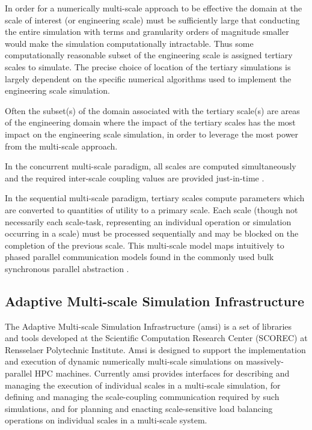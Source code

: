 \documentclass[11pt]{siamltex1213}
\begin{document}
In order for a numerically multi-scale approach to be effective the domain at the scale of interest (or engineering scale) must be sufficiently large that conducting the entire simulation with terms and granularity orders of magnitude smaller would make the simulation computationally intractable. Thus some computationally reasonable subset of the engineering scale is assigned tertiary scales to simulate. The precise choice of location of the tertiary simulations is largely dependent on the specific numerical algorithms used to implement the engineering scale simulation.

Often the subset(s) of the domain associated with the tertiary scale(s) are areas of the engineering domain where the impact of the tertiary scales has the most impact on the engineering scale simulation, in order to leverage the most power from the multi-scale approach.

In the concurrent multi-scale paradigm, all scales are computed simultaneously and the required inter-scale coupling values are provided just-in-time \cite{zeng2010concurrent}.

In the sequential multi-scale paradigm, tertiary scales compute parameters which are converted to quantities of utility to a primary scale. Each scale (though not necessarily each scale-task, representing an individual operation or simulation occurring in a scale) must be processed sequentially \cite{garcia2008sequential} and may be blocked on the completion of the previous scale. This multi-scale model maps intuitively to phased parallel communication models found in the commonly used bulk synchronous parallel abstraction \cite{valiant1990bridging}. 

\subsection{Adaptive Multi-scale Simulation Infrastructure}\label{amsi}
The Adaptive Multi-scale Simulation Infrastructure (amsi) is a set of libraries and tools developed at the Scientific Computation Research Center (SCOREC) at Rensselaer Polytechnic Institute. Amsi is designed to support the implementation and execution of dynamic numerically multi-scale simulations on massively-parallel HPC machines. Currently amsi provides interfaces for describing and managing the execution of individual scales in a multi-scale simulation, for defining and managing the scale-coupling communication required by such simulations, and for planning and enacting scale-sensitive load balancing operations on individual scales in a multi-scale system. 
\end{document}
